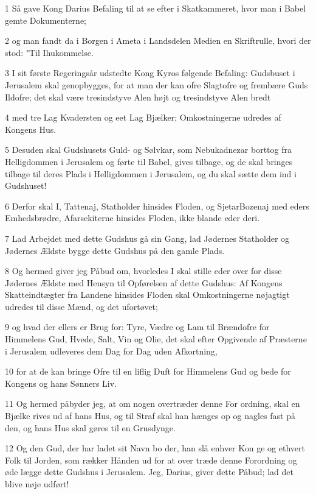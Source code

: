 \par 1 Så gave Kong Darius Befaling til at se efter i Skatkammeret, hvor man i Babel gemte Dokumenterne;
\par 2 og man fandt da i Borgen i Ameta i Landsdelen Medien en Skriftrulle, hvori der stod: "Til Ihukommelse.
\par 3 I sit første Regeringsår udstedte Kong Kyros følgende Befaling: Gudsbuset i Jerusalem skal genopbygges, for at man der kan ofre Slagtofre og frembære Guds Ildofre; det skal være tresindstyve Alen højt og tresindstyve Alen bredt
\par 4 med tre Lag Kvadersten og eet Lag Bjælker; Omkostningerne udredes af Kongens Hus.
\par 5 Desuden skal Gudshusets Guld- og Sølvkar, som Nebukadnezar borttog fra Helligdommen i Jerusalem og førte til Babel, gives tilbage, og de skal bringes tilbage til deres Plads i Helligdommen i Jerusalem, og du skal sætte dem ind i Gudshuset!
\par 6 Derfor skal I, Tattenaj, Statholder hinsides Floden, og SjetarBozenaj med eders Emhedsbrødre, Afarsekiterne hinsides Floden, ikke blande eder deri.
\par 7 Lad Arbejdet med dette Gudshus gå sin Gang, lad Jødernes Statholder og Jødernes Ældste bygge dette Gudshus på den gamle Plads.
\par 8 Og hermed giver jeg Påbud om, hvorledes I skal stille eder over for disse Jødernes Ældste med Hensyn til Opførelsen af dette Gudshus: Af Kongens Skatteindtægter fra Landene hinsides Floden skal Omkostningerne nøjagtigt udredes til disse Mænd, og det ufortøvet;
\par 9 og hvad der ellers er Brug for: Tyre, Vædre og Lam til Brændofre for Himmelens Gud, Hvede, Salt, Vin og Olie, det skal efter Opgivende af Præsterne i Jerusalem udleveres dem Dag for Dag uden Afkortning,
\par 10 for at de kan bringe Ofre til en liflig Duft for Himmelens Gud og bede for Kongens og hans Sønners Liv.
\par 11 Og hermed påbyder jeg, at om nogen overtræder denne For ordning, skal en Bjælke rives ud af hans Hus, og til Straf skal han hænges op og nagles fast på den, og hans Hus skal gøres til en Grusdynge.
\par 12 Og den Gud, der har ladet sit Navn bo der, han slå enhver Kon ge og ethvert Folk til Jorden, som rækker Hånden ud for at over træde denne Forordning og øde lægge dette Gudshus i Jerusalem. Jeg, Darius, giver dette Påbud; lad det blive nøje udført!
